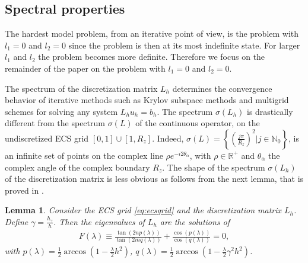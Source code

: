 \documentclass[mathpazo]{cicp}
\newtheorem{lem}[thm]{Lemma}
\theoremstyle{definition}
\numberwithin{equation}{section}
\providecommand{\wv}{}
\providecommand{\edt}{}
\begin{document}
\subsection{Spectral properties}
\wv{The hardest model problem, from a\edt{n iterative point} of view, is 
the problem with $l_1=0$ and $l_2=0$ since the problem is then \edt{at its} most
indefinite \edt{state}. For larger $l_1$ and $l_2$ the problem becomes more
definite. Therefore we focus on the remainder of the paper on the
problem with $l_1=0$ and $l_2=0$.}

The spectrum of the discretization matrix $L_h$ determines the
convergence behavior of iterative methods such as Krylov subspace
methods and multigrid schemes for solving any system $L_h u_h =
b_h$. The spectrum $\sigma(L_h)$ is drastically different from the
spectrum $\sigma(L)$ of the continuous operator, on the undiscretized
ECS grid $[0,1]\cup[1,R_z]$. Indeed, $\sigma(L) = \left\{\left(\frac{j
  \pi}{R_z}\right)^2 |j\in\mathbb{N}_0 \right\}$, is an infinite set
of points on the complex line $\rho e^{-i2\theta_\alpha}$, with
$\rho\in\mathbb{R^+}$ and $\theta_\alpha$ the complex angle of the
complex boundary $R_z$. The shape of the spectrum $\sigma(L_h)$ of the
discretization matrix is less obvious as follows from the next lemma,
that is proved in \cite{reps2009}.

\begin{lem}\label{lem:eigdis}
Consider the ECS grid \eqref{eq:ecsgrid} and the discretization matrix $L_h$. Define $\gamma =
\frac{h_\gamma}{h}$. Then the eigenvalues of $L_h$ are the solutions of
\begin{align*}
F(\lambda) \equiv \frac{\tan(2n p(\lambda))}{\tan(2m q(\lambda))}+\frac{\cos(p(\lambda))}{\cos(q(\lambda))} = 0,
\end{align*}
with $p(\lambda)=\frac{1}{2}\arccos(1-\frac{\lambda}{2}h^2)$, $q(\lambda)=\frac{1}{2}\arccos(1-\frac{\lambda}{2}\gamma^2
h^2)$.
\end{lem}
\end{document}
